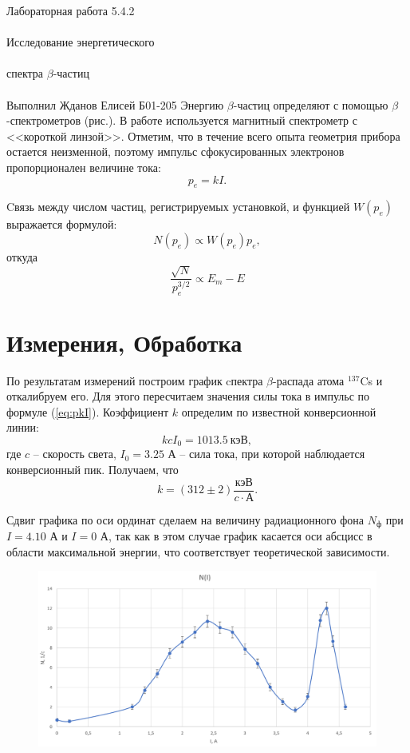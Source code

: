 \documentclass{astroedu-lab}
\begin{document}
\begin{problem}{\huge Лабораторная работа 5.4.2\\\\Исследование энергетического\\\\спектра $\beta$-частиц\\\\Выполнил Жданов Елисей Б01-205}
	Энергию $\beta$-частиц определяют с помощью $\beta$-спектрометров (рис.). В работе используется магнитный спектрометр с <<короткой линзой>>. Отметим, что в течение всего опыта геометрия прибора остается неизменной, поэтому импульс сфокусированных электронов пропорционален величине тока:
	\begin{equation}
		\label{eq:pkI}
		\tag{$\star$}
		p_e = kI.
	\end{equation}

	Cвязь между числом частиц, регистрируемых установкой, и функцией $W(p_e)$ выражается формулой:
	\begin{equation*}
		N(p_e) \propto W(p_e)p_e,
	\end{equation*}
	откуда
	\begin{equation}
		\label{eq:fermi}
		\tag{$\star \star$}
		\frac{\sqrt{N}}{p_e^{3/2}} \propto E_m - E
	\end{equation}
	
	

\section{Измерения, Обработка}




По результатам измерений построим график cпектра $\beta$-распада атома $^{137}$Cs и откалибруем его. Для этого пересчитаем значения силы тока в импульс по формуле (\ref{eq:pkI}). Коэффициент $k$ определим по известной конверсионной линии:
			$$kcI_0 = 1013.5 \ \text{кэВ},$$
		где $c$ -- скорость света, $I_0 = 3.25$ А -- сила тока, при которой наблюдается конверсионный пик. Получаем, что $$k = (312 \pm 2) \frac{\text{кэВ}}{c\cdot\text{А}}.$$
		
		Сдвиг графика по оси ординат сделаем на величину радиационного фона $N_\text{ф}$ при $I = 4.10$ А и $I = 0$ А, так как в этом случае график касается оси абсцисс в области максимальной энергии, что соответствует теоретической зависимости.
		

\begin{figure}[!h]
	\centering
	\includegraphics[width=1\textwidth]{doc.png}
	\label{fig:boiler}
\end{figure}			
		

\end{problem}
\end{document}

